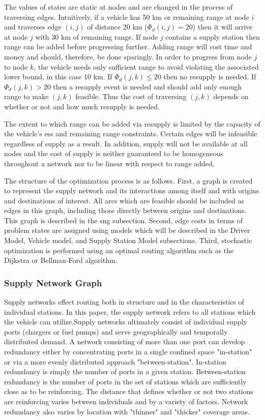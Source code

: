 The values of states are static at nodes and are changed in the process of traversing edges. Intuitively, if a vehicle has 50 km or remaining range at node $i$ and traverses edge $(i, j)$ of distance 20 km ($\Phi_d(i,j) = 20$) then it will arrive at node $j$ with 30 km of remaining range. If node $j$ contains a supply station then range can be added before progressing further. Adding range will cost time and money and should, therefore, be done sparingly. In order to progress from node $j$ to node $k$, the vehicle needs only sufficient range to avoid violating the associated lower bound, in this case 10 km. If $\Phi_d(j,k) \leq 20$ then no resupply is needed. If $\Phi_d(j,k) > 20$ then a resupply event is needed and should add only enough range to make $(j,k)$ feasible. Thus the cost of traversing $(j,k)$ depends on whether or not and how much resupply is needed. 

The extent to which range can be added via resupply is limited by the capacity of the vehicle's \gls{ess} and remaining range constraints. Certain edges will be infeasible regardless of supply as a result. In addition, supply will not be available at all nodes and the cost of supply is neither guaranteed to be homogeneous throughout a network nor to be linear with respect to range added.

The structure of the optimization process is as follows. First, a graph is created to represent the supply network and its interactions among itself and with origins and destinations of interest. All arcs which are feasible should be included as edges in this graph, including those directly between origins and destinations. This graph is described in the \gls{sng} subsection. Second, edge costs in terms of problem states are assigned using models which will be described in the Driver Model, Vehicle model, and Supply Station Model subsections. Third, stochastic optimization is performed using an optimal routing algorithm such as the Dijkstra or Bellman-Ford algorithm.

\subsubsection*{Supply Network Graph}

Supply networks effect routing both in structure and in the characteristics of individual stations. In this paper, the supply network refers to all stations which the vehicle can utilize.Supply networks ultimately consist of individual supply ports (chargers or fuel pumps) and serve geographically and temporally distributed demand. A network consisting of more than one port can develop redundancy either by concentrating ports in a single confined space "in-station" or via a more evenly distributed approach "between-station". In-station redundancy is simply the number of ports in a given station. Between-station redundancy is the number of ports in the set of stations which are sufficiently close as to be reinforcing. The distance that defines whether or not two stations are reinforcing varies between individuals and by a variety of factors. Network redundancy also varies by location with "thinner" and "thicker" coverage areas.

